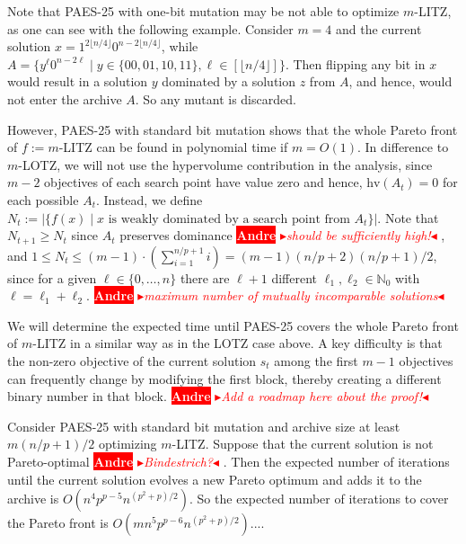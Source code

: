 \documentclass[
sigconf = false, %
review = false, %
screen = true, %
anonymous = true, %
format=acmsmall
]{acmart}
\newcommand{\LOTZ}{\textsc{LOTZ}\xspace}
\newcommand{\PAES}{PAES-25\xspace}
\newcommand{\nbc}[3]{
		{\colorbox{#3}{\bfseries\sffamily\scriptsize\textcolor{white}{#1}}}
		{\textcolor{#3}{\sf\small$\blacktriangleright$\textit{#2}$\blacktriangleleft$}}
}
\newcommand{\andre}[1]{\nbc{Andre}{#1}{red}}
\begin{document}
Note that \PAES with one-bit mutation may be not able to optimize $m$-LITZ, as one can see with the following example. Consider $m=4$ and the current solution $x=1^{2 \lfloor{n/4}\rfloor}0^{n-2 \lfloor{n/4}\rfloor}$, while $A=\{y^{\ell}0^{n-2\ell} \mid y \in \{00,01,10,11\}, \ell \in [\lfloor{n/4}\rfloor]\}$. Then flipping any bit in $x$ would result in a solution $y$ dominated by a solution $z$ from $A$, and hence, would not enter the archive $A$. So any mutant is discarded.

However, \PAES with standard bit mutation shows that the whole Pareto front of $f := m$-LITZ can be found in polynomial time if $m=O(1)$. In difference to $m$-LOTZ, we will not use the hypervolume contribution in the analysis, since $m-2$ objectives of each search point have value zero and hence, $\text{hv}(A_t)=0$ for each possible $A_t$. Instead, we define $N_t:=|\{f(x) \mid x \text{ is weakly dominated by a search point from } A_t\}|$. Note that $N_{t+1} \geq N_t$ since $A_t$ preserves dominance \andre{should be sufficiently high!}, and $1 \leq N_t \leq (m-1) \cdot (\sum_{i=1}^{n/p+1} i) = (m-1)(n/p+2)(n/p+1)/2$, since for a given $\ell \in \{0, \ldots , n\}$ there are $\ell+1$ different $\ell_1,\ell_2 \in \mathbb{N}_0$ with $\ell=\ell_1+\ell_2$. \andre{maximum number of mutually incomparable solutions}

We will determine the expected time until \PAES covers the whole Pareto front of $m$-LITZ in a similar way as in the \LOTZ case above. A key difficulty is that the non-zero objective of the current solution $s_t$ among the first $m-1$ objectives can frequently change by modifying the first block, thereby creating a different binary number in that block. \andre{Add a roadmap here about the proof!}

\begin{theorem}
\label{lem:LITZ-Pareto-Front-Covering}
Consider \PAES with standard bit mutation and archive size at least $m(n/p+1)/2$ optimizing $m$-LITZ. Suppose that the current solution is not Pareto-optimal \andre{Bindestrich?}. Then the expected number of iterations until the current solution evolves a new Pareto optimum and adds it to the archive is $O(n^4p^{p-5}n^{(p^2 + p)/2})$. So the expected number of iterations to cover the Pareto front is $O(mn^5p^{p-6}n^{(p^2 + p)/2})$....
\end{theorem}
\end{document}
